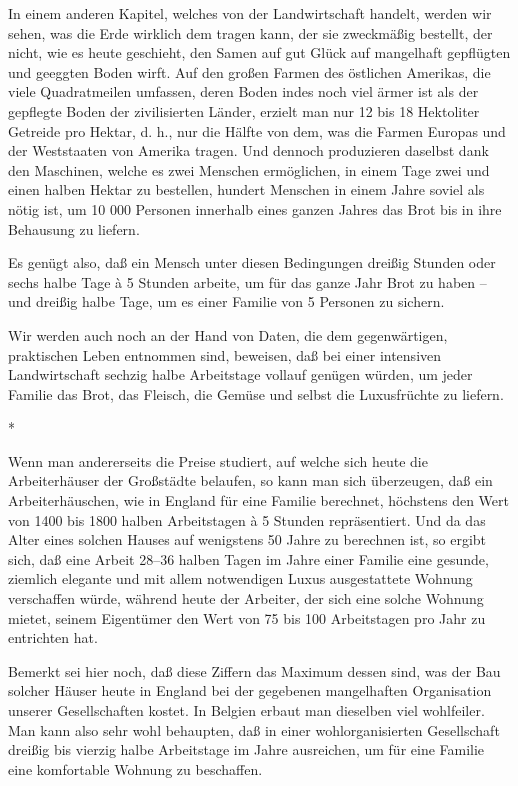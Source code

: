 \documentclass{scrbook}
\begin{document}
In einem anderen Kapitel, welches von der Landwirtschaft handelt, werden wir sehen, was die Erde wirklich dem tragen kann, der sie zweckmäßig bestellt, der nicht, wie es heute geschieht, den Samen auf gut Glück auf mangelhaft gepflügten und geeggten Boden wirft. Auf den großen Farmen des östlichen Amerikas, die viele Quadratmeilen umfassen, deren Boden indes noch viel ärmer ist als der gepflegte Boden der zivilisierten Länder, erzielt man nur 12 bis 18 Hektoliter Getreide pro Hektar, d. h., nur die Hälfte von dem, was die Farmen Europas und der Weststaaten von Amerika tragen. Und dennoch produzieren daselbst dank den Maschinen, welche es zwei Menschen ermöglichen, in einem Tage zwei und einen halben Hektar zu bestellen, hundert Menschen in einem Jahre soviel als nötig ist, um 10 000 Personen innerhalb eines ganzen Jahres das Brot bis in ihre Behausung zu liefern.

Es genügt also, daß ein Mensch unter diesen Bedingungen dreißig Stunden oder sechs halbe Tage à 5 Stunden arbeite, um für das ganze Jahr Brot zu haben – und dreißig halbe Tage, um es einer Familie von 5 Personen zu sichern.

Wir werden auch noch an der Hand von Daten, die dem gegenwärtigen, praktischen Leben entnommen sind, beweisen, daß bei einer intensiven Landwirtschaft sechzig halbe Arbeitstage vollauf genügen würden, um jeder Familie das Brot, das Fleisch, die Gemüse und selbst die Luxusfrüchte zu liefern.

\begin{center}*\end{center}

Wenn man andererseits die Preise studiert, auf welche sich heute die Arbeiterhäuser der Großstädte belaufen, so kann man sich überzeugen, daß ein Arbeiterhäuschen, wie in England für eine Familie berechnet, höchstens den Wert von 1400 bis 1800 halben Arbeitstagen à 5 Stunden repräsentiert. Und da das Alter eines solchen Hauses auf wenigstens 50 Jahre zu berechnen ist, so ergibt sich, daß eine Arbeit 28–36 halben Tagen im Jahre einer Familie eine gesunde, ziemlich elegante und mit allem notwendigen Luxus ausgestattete Wohnung verschaffen würde, während heute der Arbeiter, der sich eine solche Wohnung mietet, seinem Eigentümer den Wert von 75 bis 100 Arbeitstagen pro Jahr zu entrichten hat.

Bemerkt sei hier noch, daß diese Ziffern das Maximum dessen sind, was der Bau solcher Häuser heute in England bei der gegebenen mangelhaften Organisation unserer Gesellschaften kostet. In Belgien erbaut man dieselben viel wohlfeiler. Man kann also sehr wohl behaupten, daß in einer wohlorganisierten Gesellschaft dreißig bis vierzig halbe Arbeitstage im Jahre ausreichen, um für eine Familie eine komfortable Wohnung zu beschaffen.
\end{document}
